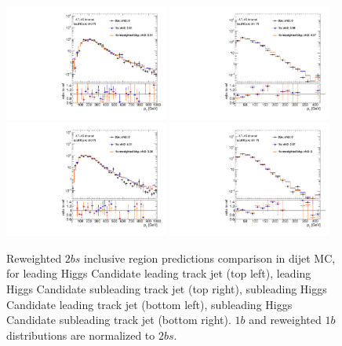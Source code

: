 \begin{figure}[htbp!]
\begin{center}
\includegraphics[width=0.48\textwidth,angle=-90]{figures/boosted/AppendixReweight/Compare/Dijet_Incl_directcompare_leadHCand_trk0_Pt_1.pdf}
\includegraphics[width=0.48\textwidth,angle=-90]{figures/boosted/AppendixReweight/Compare/Dijet_Incl_directcompare_leadHCand_trk1_Pt_1.pdf}\\
\includegraphics[width=0.48\textwidth,angle=-90]{figures/boosted/AppendixReweight/Compare/Dijet_Incl_directcompare_sublHCand_trk0_Pt_1.pdf}
\includegraphics[width=0.48\textwidth,angle=-90]{figures/boosted/AppendixReweight/Compare/Dijet_Incl_directcompare_sublHCand_trk1_Pt_1.pdf}\\
\caption{Reweighted $2bs$ inclusive region predictions comparison in dijet MC, for leading Higgs Candidate leading track jet \pt (top left),  leading Higgs Candidate subleading track jet \pt (top right), subleading Higgs Candidate leading track jet \pt (bottom left), subleading Higgs Candidate subleading track jet \pt (bottom right). $1b$ and reweighted $1b$ distributions are normalized to $2bs$.}
\label{fig:app-rw-comp-dijet-2bs-trkjet}
\end{center}
\end{figure}

